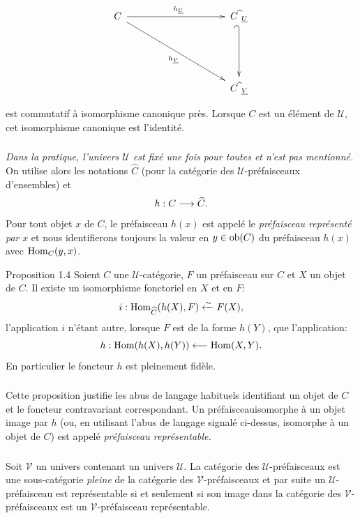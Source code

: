 \documentclass[10pt]{../fichiers-configuration-latex/smfart}
\begin{document}
\[
\xymatrix@R=1.75cm@C=3.5cm@M=.2cm{
C\ar[r]^{h_{\underline{U}}} \ar[dr]_{h_{\underline{V}}}& C{\widehat{\phantom{i}}}_{\underline{U}}\ar@{_{(}->}[d]\\
& C\widehat{\phantom{i}}_{\underline{V}} }
\]
est commutatif à isomorphisme canonique près. Lorsque $C$ est un
élément de $𝒰$, cet isomorphisme canonique est l'identité.

\subsubsection{}
\emph{Dans la pratique, l'univers $𝒰$ est fixé
  une fois pour toutes et n'est pas mentionné.} On utilise alors les
  notations $\widehat{C}$ (pour la catégorie des
  $𝒰$-préfaisceaux d'ensembles) et
$$
h:C\longrightarrow \widehat{C}{}.
$$
Pour tout objet $x$ de $C$, le préfaisceau $h(x)$ est appelé le
\emph{préfaisceau représenté par} $x$ et nous identifierons toujours
la valeur en $y\in \operatorname{ob}(C)$ du préfaisceau $h(x)$ avec $\operatorname{Hom}_C(y,x)$.

\begin{enonce*}{Proposition 1.4}
Soient $C$ une $𝒰$-catégorie, $F$ un préfaisceau sur $C$ et
$X$ un objet de $C$. Il existe un isomorphisme fonctoriel en $X$ et
en $F$:
$$
i:\operatorname{Hom}_{\widehat{C}}(h(X),F)\xleftarrow{\sim}
F(X){},
$$
l'application $i$ n'étant autre, lorsque $F$ est de la forme $h(Y)$,
que l'application:
$$
h:\operatorname{Hom}(h(X), h(Y))\longleftarrow \operatorname{Hom}(X,Y){}.
$$
En particulier le foncteur $h$ est pleinement fidèle.
\end{enonce*}

\setcounter{subsection}{4} \setcounter{subsubsection}{0}
\subsubsection{}
Cette proposition justifie les abus de langage habituels identifiant
un objet de $C$ et le foncteur contravariant correspondant. Un
préfaisceau\pageoriginale isomorphe à un objet image par $h$ (ou, en
utilisant l'abus de langage signalé ci-dessus, isomorphe à un objet
de $C$) est appelé \emph{préfaisceau représentable.}

\subsubsection{}
Soit $𝒱$ un univers contenant un univers $𝒰$. La
catégorie des $𝒰$-préfaisceaux est une sous-catégorie
\emph{pleine} de la catégorie des $𝒱$-préfaisceaux et par
suite un $𝒰$-préfaisceau est représentable si et seulement
si son image dans la catégorie des $𝒱$-préfaisceaux est un
$𝒱$-préfaisceau représentable.
\end{document}
